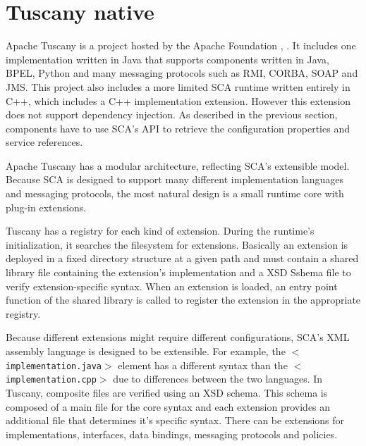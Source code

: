 \section{Tuscany native}

Apache Tuscany is a project hosted by the Apache Foundation \cite{Tuscany}, \cite{Laws}. It includes one implementation written
in Java that supports components written in Java, BPEL, Python and many messaging protocols such as RMI, CORBA, SOAP and JMS.
This project also includes a more limited SCA runtime written entirely in C++, which includes a C++ implementation extension.
However this extension does not support dependency injection. As described in the previous section, components have to use
SCA's API to retrieve the configuration properties and service references.

Apache Tuscany has a modular architecture, reflecting SCA's extensible model. Because SCA is designed to support many
different implementation languages and messaging protocols, the most natural design is a small runtime core with plug-in extensions.

Tuscany has a registry for each kind of extension. During the runtime's initialization, it searches the filesystem for
extensions. Basically an extension is deployed in a fixed directory structure at a given path and must contain a shared
library file containing the extension's implementation and a XSD Sshema file to verify extension-specific syntax.
When an extension is loaded, an entry point function of the shared library is called to register the extension in
the appropriate registry.

Because different extensions might require different configurations, SCA's XML assembly language is designed to be extensible.
For example, the \texttt{$<$implementation.java$>$} element has a different syntax than the \texttt{$<$implementation.cpp$>$}
due to differences between the two languages. In Tuscany, composite files are verified using an XSD schema. This schema is
composed of a main file for the core syntax and each extension provides an additional file that determines it's specific syntax.
There can be extensions for implementations, interfaces, data bindings, messaging protocols and policies.



